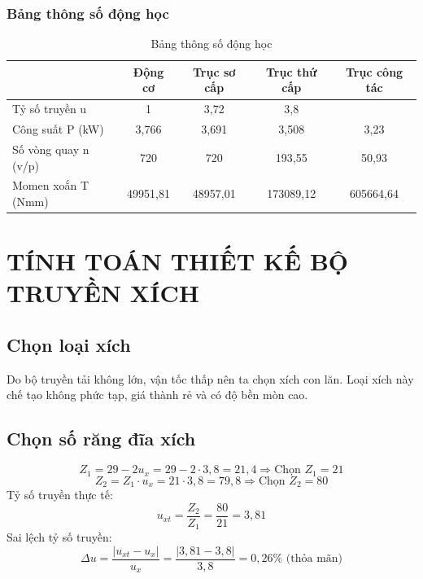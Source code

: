 \documentclass[12pt,a4paper]{report}
\begin{document}
\subsection{Bảng thông số động học}
\begin{table}[H]
    \centering
    \caption{Bảng thông số động học}
    \label{tab:1.2}
    \begin{tabular}{|l|c|c|c|c|}
        \hline
        & Động cơ & Trục sơ cấp & Trục thứ cấp & Trục công tác \\
        \hline
        Tỷ số truyền u & 1 & 3,72 & 3,8 & \\
        \hline
        Công suất P (kW) & 3,766 & 3,691 & 3,508 & 3,23 \\
        \hline
        Số vòng quay n (v/p) & 720 & 720 & 193,55 & 50,93 \\
        \hline
        Momen xoắn T (Nmm) & 49951,81 & 48957,01 & 173089,12 & 605664,64 \\
        \hline
    \end{tabular}
\end{table}

\chapter{TÍNH TOÁN THIẾT KẾ BỘ TRUYỀN XÍCH}

\section{Chọn loại xích}
Do bộ truyền tải không lớn, vận tốc thấp nên ta chọn xích con lăn. Loại xích này chế tạo không phức tạp, giá thành rẻ và có độ bền mòn cao.

\section{Chọn số răng đĩa xích}
$$Z_1 = 29 - 2u_x = 29 - 2 \cdot 3{,}8 = 21{,}4 \Rightarrow \text{Chọn } Z_1 = 21$$
$$Z_2 = Z_1 \cdot u_x = 21 \cdot 3{,}8 = 79{,}8 \Rightarrow \text{Chọn } Z_2 = 80$$
Tỷ số truyền thực tế:
$$u_{xt} = \frac{Z_2}{Z_1} = \frac{80}{21} = 3{,}81$$
Sai lệch tỷ số truyền:
$$\Delta u = \frac{|u_{xt} - u_x|}{u_x} = \frac{|3{,}81 - 3{,}8|}{3{,}8} = 0{,}26\% \text{ (thỏa mãn)}$$
\end{document}
